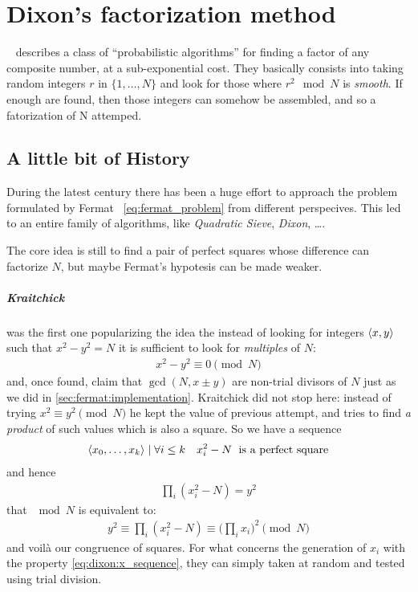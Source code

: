 \chapter{Dixon's factorization method\label{chap:dixon}}

~\cite{dixon} describes a class of ``probabilistic algorithms'' for finding a
factor of any composite number, at a sub-exponential cost. They basically
consists into taking random integers $r$ in $\{1, \ldots, N\}$ and look for those
where $r^2 \mod{N}$ is \emph{smooth}. If enough are found, then those integers
can somehow be assembled, and so a fatorization of N attemped.

\section{A little bit of History \label{sec:dixon:history}}
During the latest century there has been a huge effort to approach the problem
formulated by Fermat ~\ref{eq:fermat_problem} from different perspecives. This
led to an entire family of algorithms, like \emph{Quadratic Sieve},
\emph{Dixon}, \ldots.

The core idea is still to find a pair of perfect squares whose difference can
factorize $N$, but maybe Fermat's hypotesis can be made weaker.

\paragraph{Kraitchick} was the first one popularizing the idea the instead of
looking for integers $\langle x, y\rangle$ such that $x^2 -y^2 = N$ it is sufficient
to look for \emph{multiples} of $N$:
\begin{align}
  x^2 - y^2 \equiv 0 \pmod{N}
\end{align}
and, once found, claim that $\gcd(N, x \pm y)$ are non-trial divisors of $N$
just as we did in \ref{sec:fermat:implementation}.
Kraitchick did not stop here: instead of trying $x^2 \equiv y^2 \pmod{N}$ he
kept the value of previous attempt, and tries to find \emph{a product} of such
values which is also a square. So we have a sequence
\begin{align}
  \label{eq:dixon:x_sequence}
  \langle x_0, \ldots, x_k\rangle \mid \forall i \leq k \quad x_i^2 - N
  \; \text{ is a perfect square}
\end{align}
and hence
\begin{align*}
  \prod_i (x_i^2 - N) = y^2
\end{align*}
that $\mod{N}$ is equivalent to:
\begin{align}
  \label{eq:dixon:fermat_revisited}
  y^2 \equiv \prod_i (x_i^2 - N) \equiv \big( \prod_i x_i \big) ^2 \pmod{N}
\end{align}
and voil\`a our congruence of squares. For what concerns the generation of $x_i$
with the property \ref{eq:dixon:x_sequence}, they can simply taken at random and
tested using trial division.

